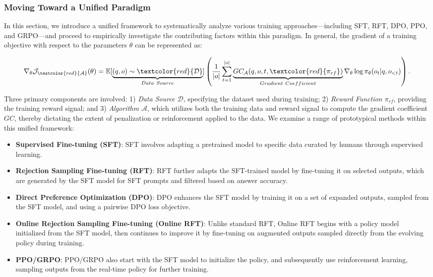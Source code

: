 \begin{itemize}[topsep=0pt]
\begin{itemize}[topsep=0pt]
\subsubsection{Moving Toward a Unified Paradigm}
In this section, we introduce a unified framework to systematically analyze various training approaches—including SFT, RFT, DPO, PPO, and GRPO—and proceed to empirically investigate the contributing factors within this paradigm. In general, the gradient of a training objective with respect to the parameters $\theta$ can be represented as:

\begin{equation}
    \nabla_{\theta}\mathcal{J}_{\textcolor{red}{\mathcal{A}}}(\theta) = \mathbb{E}[\underbrace{(q,o) \sim \textcolor{red}{\mathcal{D}}}_{Data \ Source}]\left( \frac{1}{|o|} \sum_{t=1}^{|o|}  \underbrace{GC_{{\mathcal{A}}}(q, o, t, \textcolor{red}{\pi_{{rf}}})}_{Gradient \ Coefficient}  \nabla_{\theta}\log \pi_{\theta}(o_t | q, o_{<t})\right).
\label{eq:objective}
\end{equation}

Three primary components are involved: 1) \textit{Data Source $\mathcal{D}$}, specifying the dataset used during training; 2) \textit{Reward Function $\pi_{{rf}}$}, providing the training reward signal; and 3) \textit{Algorithm $\mathcal{A}$}, which utilizes both the training data and reward signal to compute the gradient coefficient $GC$, thereby dictating the extent of penalization or reinforcement applied to the data. We examine a range of prototypical methods within this unified framework:

\begin{itemize}
    \item  \textbf{Supervised Fine-tuning (SFT)}: SFT involves adapting a pretrained model to specific data curated by humans through supervised learning.
    \item \textbf{Rejection Sampling Fine-tuning (RFT)}: RFT further adapts the SFT-trained model by fine-tuning it on selected outputs, which are generated by the SFT model for SFT prompts and filtered based on answer accuracy.
    \item \textbf{Direct Preference Optimization (DPO)}: DPO enhances the SFT model by training it on a set of expanded outputs, sampled from the SFT model, and using a pairwise DPO loss objective.
    \item \textbf{Online Rejection Sampling Fine-tuning (Online RFT)}: Unlike standard RFT, Online RFT begins with a policy model initialized from the SFT model, then continues to improve it by fine-tuning on augmented outputs sampled directly from the evolving policy during training.
    \item \textbf{PPO/GRPO}: PPO/GRPO also start with the SFT model to initialize the policy, and subsequently use reinforcement learning, sampling outputs from the real-time policy for further training.
\end{itemize}


\end{itemize}
\end{itemize}

